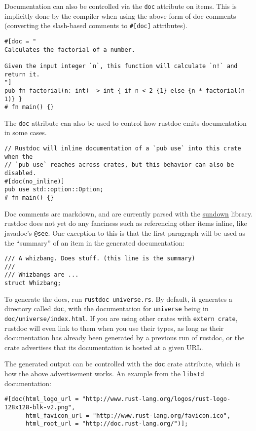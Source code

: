 \documentclass[]{article}
\begin{document}
Documentation can also be controlled via the \texttt{doc} attribute on
items. This is implicitly done by the compiler when using the above form
of doc comments (converting the slash-based comments to
\texttt{\#{[}doc{]}} attributes).

\begin{verbatim}
#[doc = "
Calculates the factorial of a number.

Given the input integer `n`, this function will calculate `n!` and return it.
"]
pub fn factorial(n: int) -> int { if n < 2 {1} else {n * factorial(n - 1)} }
# fn main() {}
\end{verbatim}

The \texttt{doc} attribute can also be used to control how rustdoc emits
documentation in some cases.

\begin{verbatim}
// Rustdoc will inline documentation of a `pub use` into this crate when the
// `pub use` reaches across crates, but this behavior can also be disabled.
#[doc(no_inline)]
pub use std::option::Option;
# fn main() {}
\end{verbatim}

Doc comments are markdown, and are currently parsed with the
\href{https://github.com/vmg/sundown/}{sundown} library. rustdoc does
not yet do any fanciness such as referencing other items inline, like
javadoc's \texttt{@see}. One exception to this is that the first
paragraph will be used as the ``summary'' of an item in the generated
documentation:

\begin{verbatim}
/// A whizbang. Does stuff. (this line is the summary)
///
/// Whizbangs are ...
struct Whizbang;
\end{verbatim}

To generate the docs, run \texttt{rustdoc universe.rs}. By default, it
generates a directory called \texttt{doc}, with the documentation for
\texttt{universe} being in \texttt{doc/universe/index.html}. If you are
using other crates with \texttt{extern crate}, rustdoc will even link to
them when you use their types, as long as their documentation has
already been generated by a previous run of rustdoc, or the crate
advertises that its documentation is hosted at a given URL.

The generated output can be controlled with the \texttt{doc} crate
attribute, which is how the above advertisement works. An example from
the \texttt{libstd} documentation:

\begin{verbatim}
#[doc(html_logo_url = "http://www.rust-lang.org/logos/rust-logo-128x128-blk-v2.png",
      html_favicon_url = "http://www.rust-lang.org/favicon.ico",
      html_root_url = "http://doc.rust-lang.org/")];
\end{verbatim}
\end{document}

